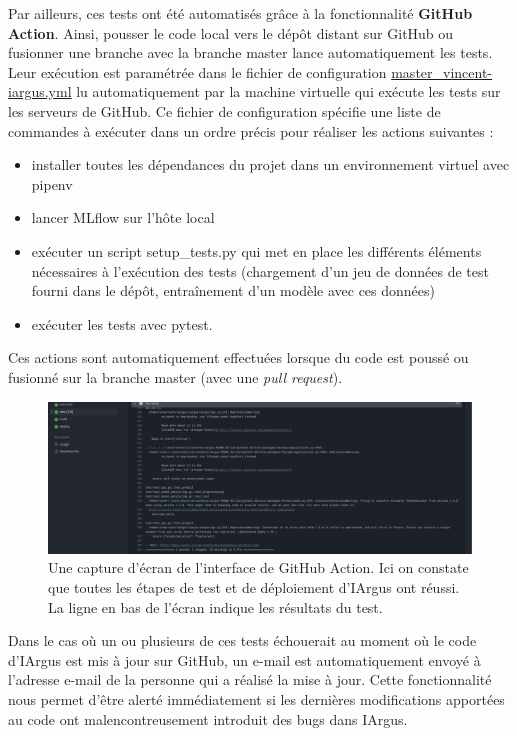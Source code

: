 \documentclass[french]{article}
\begin{document}
    Par ailleurs, ces tests ont été automatisés grâce à la fonctionnalité \textbf{GitHub Action}. Ainsi, pousser le code local vers le dépôt distant sur GitHub ou fusionner une branche avec la branche master lance automatiquement les tests. Leur exécution est paramétrée dans le fichier de configuration \href{https://github.com/vinpap/iargus/blob/fea8247513304d645d6cb4ff5857fe8951ff95e0/.github/workflows/master_vincent-iargus.yml}{master\_vincent-iargus.yml} lu automatiquement par la machine virtuelle qui exécute les tests sur les serveurs de GitHub. Ce fichier de configuration spécifie une liste de commandes à exécuter dans un ordre précis pour réaliser les actions suivantes :
    \begin{itemize}
        \item installer toutes les dépendances du projet dans un environnement virtuel avec pipenv
        \item lancer MLflow sur l'hôte local
        \item exécuter un script setup\_tests.py qui met en place les différents éléments nécessaires à l'exécution des tests (chargement d'un jeu de données de test fourni dans le dépôt, entraînement d'un modèle avec ces données)
        \item exécuter les tests avec pytest.
    \end{itemize}

    Ces actions sont automatiquement effectuées lorsque du code est poussé ou fusionné sur la branche master (avec une \textit{pull request}).

    \begin{figure}[h!]
        \includegraphics[width=12cm]{gh_action}
        \centering
        \caption{Une capture d'écran de l'interface de GitHub Action. Ici on constate que toutes les étapes de test et de déploiement d'IArgus ont réussi. La ligne en bas de l'écran indique les résultats du test.}
    \end{figure}

    Dans le cas où un ou plusieurs de ces tests échouerait au moment où le code d'IArgus est mis à jour sur GitHub, un e-mail est automatiquement envoyé à l'adresse e-mail de la personne qui a réalisé la mise à jour. Cette fonctionnalité nous permet d'être alerté immédiatement si les dernières modifications apportées au code ont malencontreusement introduit des bugs dans IArgus.
\end{document}
